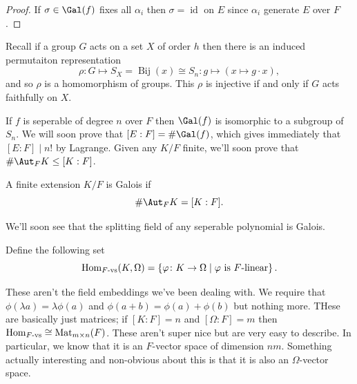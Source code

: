 \begin{proof}
If $\sigma \in \Gal(f)$ fixes all $\alpha_i$ then $\sigma = \operatorname{id}$ on $E$ since $\alpha_i$ generate $E$ over $F$.
\end{proof}

Recall if a group $G$ acts on a set $X$ of order $h$ then there is an induced permutaiton representation 
\[ \rho\colon G \mapsto S_X = \operatorname{Bij}(x) \cong S_n : g \mapsto (x \mapsto g \cdot x), \]
and so $\rho$ is a homomorphism of groups. This $\rho$ is injective if and only if $G$ acts faithfully on $X$.

\begin{corollary}
If $f$ is seperable of degree $n$ over $F$ then $\Gal(f)$ is isomorphic to a subgroup of $S_n$. We will soon prove that $[E : F] = \#\Gal(f)$, which gives immediately that $[E:F] \mid n!$ by Lagrange. Given any $K/F$ finite, we'll soon prove that $\#\Aut_FK \leq [K : F]$.
\end{corollary}

\begin{definition}
A finite extension $K/F$ is Galois if \[\#\Aut_F K = [K : F].\]
\end{definition}

We'll soon see that the splitting field of any seperable polynomial is Galois.

\begin{definition}
Define the following set
\[  \operatorname{Hom}_{F\text{-vs}}(K, \Omega) = \left\{ \varphi\colon K \to \Omega \mid \text{$\varphi$ is $F$-linear} \right\}. \]
\end{definition}
These aren't the field embeddings we've been dealing with. We require that $\phi(\lambda a) = \lambda\phi(a)$ and $\phi(a+b) = \phi(a) + \phi(b)$ but nothing more. THese are basically just matrices; if $[K:F] = n$ and $[\Omega:F] = m$ then $\operatorname{Hom}_{F\text{-vs}}\cong \operatorname{Mat}_{m\times n}(F)$. These aren't super nice but are very easy to describe. In particular, we know that it is an $F$-vector space of dimension $nm$. Something actually interesting and non-obvious about this is that it is also an $\Omega$-vector space.